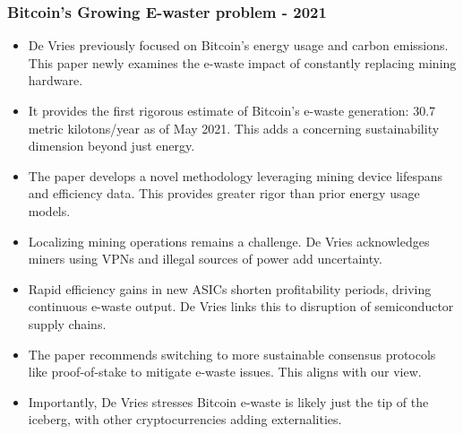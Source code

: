 \documentclass{article}
\begin{document}
\subsubsection{Bitcoin's Growing E-waster problem - 2021} \cite{devriesBitcoinGrowingEwaste2021}
\begin{itemize}
    \item De Vries previously focused on Bitcoin's energy usage and carbon emissions. This paper newly examines the e-waste impact of constantly replacing mining hardware.
    \item It provides the first rigorous estimate of Bitcoin's e-waste generation: 30.7 metric kilotons/year as of May 2021. This adds a concerning sustainability dimension beyond just energy.
    \item The paper develops a novel methodology leveraging mining device lifespans and efficiency data. This provides greater rigor than prior energy usage models.
    \item Localizing mining operations remains a challenge. De Vries acknowledges miners using VPNs and illegal sources of power add uncertainty.
    \item Rapid efficiency gains in new ASICs shorten profitability periods, driving continuous e-waste output. De Vries links this to disruption of semiconductor supply chains.
    \item The paper recommends switching to more sustainable consensus protocols like proof-of-stake to mitigate e-waste issues. This aligns with our view.
    \item Importantly, De Vries stresses Bitcoin e-waste is likely just the tip of the iceberg, with other cryptocurrencies adding externalities.
\end{itemize}
\end{document}
